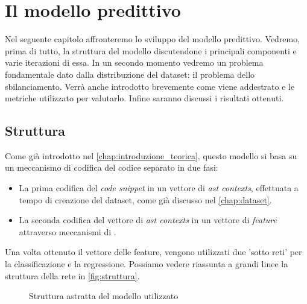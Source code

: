 \chapter{Il modello predittivo}\label{chap:modello}

Nel seguente capitolo affronteremo lo sviluppo del modello predittivo. 
Vedremo, prima di tutto, la struttura del modello discutendone i principali componenti e varie iterazioni di essa.  
In un secondo momento vedremo un problema fondamentale dato dalla distribuzione del dataset: il problema dello sbilanciamento.
Verrà anche introdotto brevemente come viene addestrato e le metriche utilizzato per valutarlo.
Infine saranno discussi i risultati ottenuti. 

\section{Struttura}
Come già introdotto nel \autoref{chap:introduzione_teorica}, questo modello si basa su un meccanismo di codifica del codice separato in due fasi:
    \begin{itemize}
        \item La prima codifica del \textit{code snippet} in un vettore di \textit{ast contexts}, effettuata a tempo di creazione del dataset, come già discusso nel \autoref{chap:dataset}.
        \item La seconda codifica del vettore di \textit{ast contexts} in un vettore di \textit{feature} attraverso meccanismi di \DL.
    \end{itemize}
Una volta ottenuto il vettore delle feature, vengono utilizzati due 'sotto reti' per la classificazione e la regressione. 
Possiamo vedere riassunta a grandi linee la struttura della rete in \autoref{fig:struttura}.

\begin{figure}[h]
    \centering
      \caption{Struttura astratta del modello utilizzato}
      \label{fig:struttura}
\end{figure}

